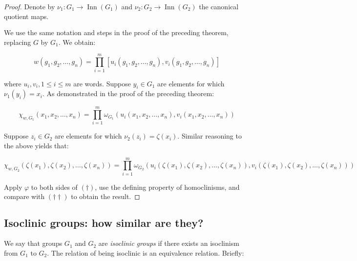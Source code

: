 \begin{proof}
  Denote by $\nu_1:G_1 \to \operatorname{Inn}(G_1)$ and $\nu_2:G_2 \to
  \operatorname{Inn}(G_2)$ the canonical quotient maps.

  We use the same notation and steps in the proof of the preceding
  theorem, replacing $G$ by $G_1$. We obtain:

  $$w(g_1,g_2,\dots,g_n) =  \prod_{i=1}^m[u_i(g_1,g_2,\dots,g_n),v_i(g_1,g_2,\dots,g_n)]$$

  where $u_i,v_i, 1 \le i \le m$ are words. Suppose $y_i \in G_1$ are
  elements for which $\nu_1(y_i) = x_i$. As demonstrated in the proof of
  the preceding theorem:

  \begin{equation*}
    \chi_{w,G_1}(x_1,x_2,\dots,x_n) = \prod_{i=1}^m \omega_{G_1}(u_i(x_1,x_2,\dots,x_n),v_i(x_1,x_2,\dots,x_n)) \tag{$\dagger$}
  \end{equation*}

  Suppose $z_i \in G_2$ are elements for which $\nu_2(z_i) =
  \zeta(x_i)$. Similar reasoning to the above yields that:

  \begin{small}
  \begin{equation*}
    \chi_{w,G_2}(\zeta(x_1),\zeta(x_2),\dots,\zeta(x_n)) = \prod_{i=1}^m \omega_{G_2}(u_i(\zeta(x_1),\zeta(x_2),\dots,\zeta(x_n)),v_i(\zeta(x_1),\zeta(x_2),\dots,\zeta(x_n))) \tag{$\dagger\dagger$}
  \end{equation*}
  \end{small}
  Apply $\varphi$ to both sides of $(\dagger)$, use the defining
  property of homoclinisms, and compare with $(\dagger\dagger)$ to
  obtain the result.
\end{proof}

\subsection{Isoclinic groups: how similar are they?}

We say that groups $G_1$ and $G_2$ are {\em isoclinic groups} if there
exists an isoclinism from $G_1$ to $G_2$. The relation of being
isoclinic is an equivalence relation. Briefly:

